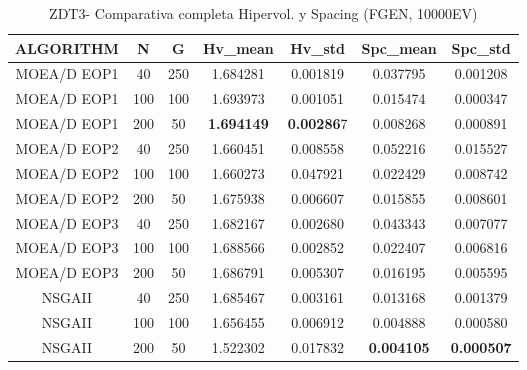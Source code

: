 \begin{table}[H]
\centering
\renewcommand{\arraystretch}{1.5}
\begin{tabular}{ccccccc}
\toprule
ALGORITHM &    N &    G &   Hv\_mean &    Hv\_std &  Spc\_mean &   Spc\_std \\
\midrule
MOEA/D EOP1 &   40 &  250 &  1.684281 &  0.001819 &  0.037795 &  0.001208 \\
MOEA/D EOP1 &  100 &  100 &  1.693973 &  0.001051 &  0.015474 &  0.000347 \\
MOEA/D EOP1 &  200 &   50 &  \textbf{1.694149} &  \textbf{0.00286}7 &  0.008268 &  0.000891 \\
MOEA/D EOP2 &   40 &  250 &  1.660451 &  0.008558 &  0.052216 &  0.015527 \\
MOEA/D EOP2 &  100 &  100 &  1.660273 &  0.047921 &  0.022429 &  0.008742 \\
MOEA/D EOP2 &  200 &   50 &  1.675938 &  0.006607 &  0.015855 &  0.008601 \\
MOEA/D EOP3 &   40 &  250 &  1.682167 &  0.002680 &  0.043343 &  0.007077 \\
MOEA/D EOP3 &  100 &  100 &  1.688566 &  0.002852 &  0.022407 &  0.006816 \\
MOEA/D EOP3 &  200 &   50 &  1.686791 &  0.005307 &  0.016195 &  0.005595 \\
NSGAII &   40 &  250 &  1.685467 &  0.003161 &  0.013168 &  0.001379 \\
NSGAII &  100 &  100 &  1.656455 &  0.006912 &  0.004888 &  0.000580 \\
NSGAII &  200 &   50 &  1.522302 &  0.017832 &  \textbf{0.004105} &  \textbf{0.000507} \\
\bottomrule
\end{tabular}

\caption{ZDT3- Comparativa completa Hipervol. y Spacing (FGEN, 10000EV)}
\label{table:2}
\end{table}

